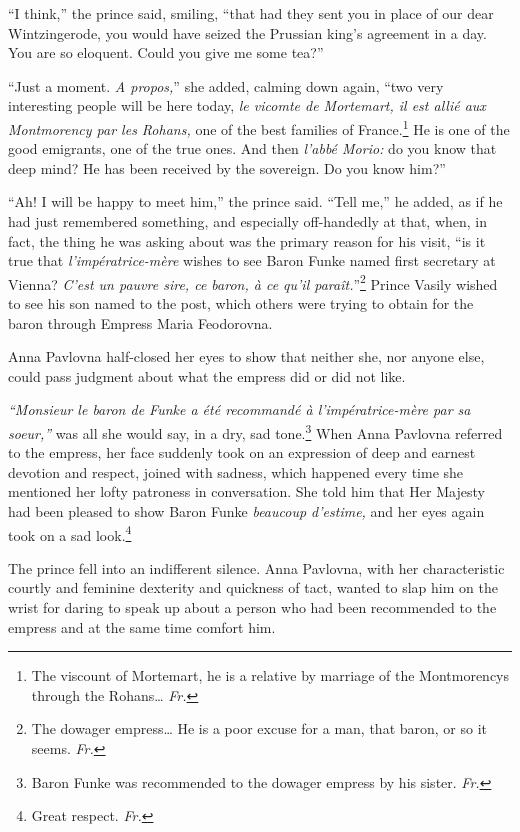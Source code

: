``I think,'' the prince said, smiling, ``that had they sent you in
place of our dear Wintzingerode, you would have seized the Prussian
king's agreement in a day. You are so eloquent. Could you give me some
tea?'' %

``Just a moment. \textit{A propos,}'' she added, calming down again,
``two very interesting people will be here today, \textit{le vicomte
  de Mortemart, il est alli\'e aux Montmorency par les Rohans,} one of
the best families of France.\footnote{The viscount of Mortemart, he is
  a relative by marriage of the Montmorencys through the
  Rohans\ldots{} \textit{Fr.}} He is one of the good emigrants, one of
the true ones. And then \textit{l'abb\'e Morio:} do you know that deep
mind? He has been received by the sovereign. Do you know him?''

``Ah! I will be happy to meet him,'' the prince said. ``Tell me,'' he
added, as if he had just remembered something, and especially
off-handedly at that, when, in fact, the thing he was asking about was
the primary reason for his visit, ``is it true that
\textit{l'imp\'eratrice-m\`ere} wishes to see Baron Funke named first
secretary at Vienna? \textit{C'est un pauvre sire, ce baron, \`a ce
  qu'il para\^it.}''\footnote{The dowager empress\ldots{} He is a poor
  excuse for a man, that baron, or so it seems. \textit{Fr.}} Prince
Vasily wished to see his son named to the post, which others were
trying to obtain for the baron through Empress Maria Feodorovna. %

Anna Pavlovna half-closed her eyes to show that neither she, nor
anyone else, could pass judgment about what the empress did or did not
like.

\textit{``Monsieur le baron de Funke a \'et\'e recommand\'e \`a
  l'imp\'eratrice-m\`ere par sa soeur,''} was all she would say, in a
dry, sad tone.\footnote{Baron Funke was recommended to the dowager
  empress by his sister. \textit{Fr.}} When Anna Pavlovna referred to
the empress, her face suddenly took on an expression of deep and
earnest devotion and respect, joined with sadness, which happened
every time she mentioned her lofty patroness in conversation. She told
him that Her Majesty had been pleased to show Baron Funke
\textit{beaucoup d'estime,} and her eyes again took on a sad
look.\footnote{Great respect. \textit{Fr.}} %

The prince fell into an indifferent silence. Anna Pavlovna, with her
characteristic courtly and feminine dexterity and quickness of tact,
wanted to slap him on the wrist for daring to speak up about a person
who had been recommended to the empress and at the same time comfort
him.

